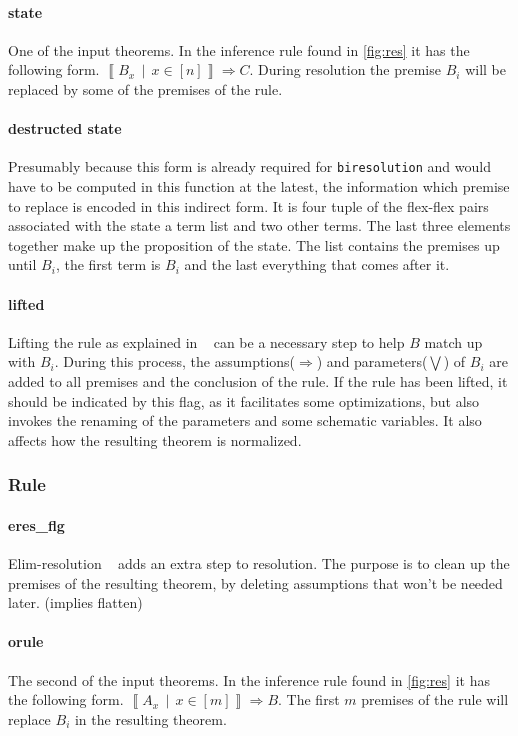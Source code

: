 \paragraph{state}
One of the input theorems. In the inference rule found in \ref{fig:res} it has the following form. $\left\llbracket B_x\,\middle|\, x \in \left[ n \right] \right\rrbracket \Longrightarrow C$. During resolution the premise $B_i$ will be replaced by some of the premises of the rule.
\paragraph{destructed state}
Presumably because this form is already required for \texttt{biresolution} and would have to be computed in this function at the latest, the information which premise to replace is encoded in this indirect form. It is four tuple of the flex-flex pairs associated with the state a term list and two other terms. The last three elements together make up the proposition of the state. The list contains the premises up until $B_i$, the first term is $B_i$ and the last everything that comes after it. 
\paragraph{lifted}
Lifting the rule as explained in ~\parencite{Paulson1994} can be a necessary step to help $B$ match up with $B_i$. During this process, the assumptions($\Longrightarrow$) and parameters($\bigvee$) of $B_i$ are added to all premises and the conclusion of the rule. If the rule has been lifted, it should be indicated by this flag, as it facilitates some optimizations, but also invokes the renaming of the parameters and some schematic variables. It also affects how the resulting theorem is normalized.

\subsubsection{Rule}
\paragraph{eres\_flg}
Elim-resolution ~\parencite{Paulson1994} adds an extra step to resolution. The purpose is to clean up the premises of the resulting theorem, by deleting assumptions that won't be needed later. (implies flatten)
\paragraph{orule}
The second of the input theorems. In the inference rule found in \ref{fig:res} it has the following form. $\left\llbracket A_x\,\middle|\, x \in \left[ m \right] \right\rrbracket \Longrightarrow B$. The first $m$ premises of the rule will replace $B_i$ in the resulting theorem.
